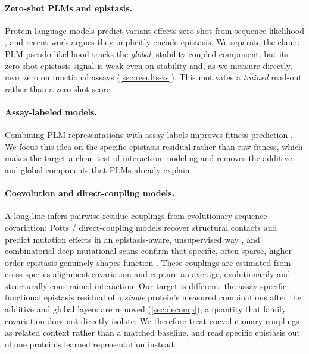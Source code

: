 \documentclass{article}
\begin{document}
\paragraph{Zero-shot PLMs and epistasis.}
Protein language models predict variant effects zero-shot from sequence
likelihood \citep{meier2021language,wang2024dplm,lin2023esm2}, and recent work
argues they implicitly encode epistasis. We separate the claim: PLM
pseudo-likelihood tracks the \emph{global}, stability-coupled component, but its
zero-shot epistasis signal is weak even on stability and, as we measure directly,
near zero on functional assays (\cref{sec:results-zs}). This motivates a \emph{trained}
read-out rather than a zero-shot score.

\paragraph{Assay-labeled models.}
Combining PLM representations with assay labels improves fitness prediction
\citep{hsu2022learning}. We focus this idea on the specific-epistasis residual
rather than raw fitness, which makes the target a clean test of interaction
modeling and removes the additive and global components that PLMs already explain.

\paragraph{Coevolution and direct-coupling models.}
A long line infers pairwise residue couplings from evolutionary sequence
covariation: Potts / direct-coupling models recover structural contacts
\citep{morcos2011direct} and predict mutation effects in an epistasis-aware,
unsupervised way \citep{hopf2017mutation}, and combinatorial deep mutational
scans confirm that specific, often sparse, higher-order epistasis genuinely
shapes function \citep{poelwijk2019learning}. These couplings are estimated from
cross-species alignment covariation and capture an average, evolutionarily and
structurally constrained interaction. Our target is different: the
assay-specific functional epistasis residual of a \emph{single} protein's
measured combinations after the additive and global layers are removed
(\cref{sec:decomp}), a quantity that family covariation does not directly
isolate. We therefore treat coevolutionary couplings as related context rather
than a matched baseline, and read specific epistasis out of one protein's
learned representation instead.
\end{document}
